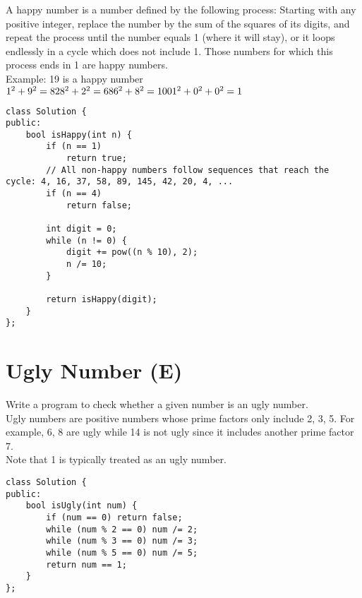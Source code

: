 A happy number is a number defined by the following process: Starting with any positive integer, replace the number by the sum of the squares of its digits, and repeat the process until the number equals 1 (where it will stay), or it loops endlessly in a cycle which does not include 1. Those numbers for which this process ends in 1 are happy numbers.\\

Example: 19 is a happy number\\

    $1^2 + 9^2 = 82\\
    8^2 + 2^2 = 68\\
    6^2 + 8^2 = 100\\
    1^2 + 0^2 + 0^2 = 1$\\
    
\begin{lstlisting}
class Solution {
public:
    bool isHappy(int n) {
        if (n == 1) 
            return true;
        // All non-happy numbers follow sequences that reach the cycle: 4, 16, 37, 58, 89, 145, 42, 20, 4, ... 
        if (n == 4)         
            return false;

        int digit = 0;
        while (n != 0) {
            digit += pow((n % 10), 2);
            n /= 10;
        }
        
        return isHappy(digit);
    }
};
\end{lstlisting}


\section{Ugly Number (E)}
Write a program to check whether a given number is an ugly number.\\

Ugly numbers are positive numbers whose prime factors only include 2, 3, 5. For example, 6, 8 are ugly while 14 is not ugly since it includes another prime factor 7.\\

Note that 1 is typically treated as an ugly number. \\

\begin{lstlisting}
class Solution {
public:
    bool isUgly(int num) {
        if (num == 0) return false;
        while (num % 2 == 0) num /= 2;
        while (num % 3 == 0) num /= 3;
        while (num % 5 == 0) num /= 5;
        return num == 1;
    }
};
\end{lstlisting}


